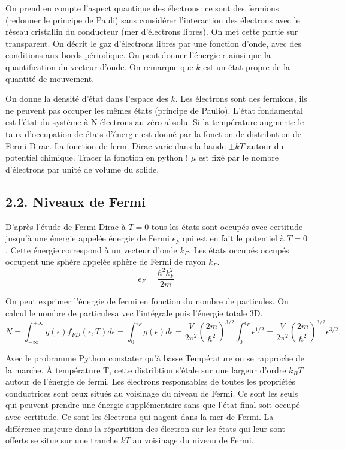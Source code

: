 \documentclass[french, a4paper, 10pt, twocolumn, landscape]{article}
\begin{document}
On prend en compte l'aspect quantique des électrons: ce sont des fermions (redonner le principe de Pauli) sans considérer l'interaction des électrons avec le réseau cristallin du conducteur (mer d'électrons libres). On met cette partie sur transparent. On décrit le gaz d'électrons libres par une fonction d'onde, avec des conditions aux bords périodique. On peut donner l'énergie $\epsilon$ ainsi que la quantification du vecteur d'onde. On remarque que $k$ est un état propre de la quantité de mouvement.\medskip


On donne la densité d'état dans l'espace des $k$. Les électrons sont des fermions, ils ne peuvent pas occuper les mêmes états (principe de Paulio). L'état fondamental est l'état du système à N électrons au zéro absolu. Si la température augmente le taux d'occupation de états d'énergie est donné par la fonction de distribution de Fermi Dirac. La fonction de fermi Dirac varie dans la bande $\pm kT$ autour du potentiel chimique. Tracer la fonction en python ! $\mu$ est fixé par le nombre d'électrons par unité de volume du solide.

\subsection*{2.2. Niveaux de Fermi}

D'après l'étude de Fermi Dirac à $T=0$ tous les états sont occupés avec certitude jusqu'à une énergie appelée énergie de Fermi $\epsilon_F$ qui est en fait le potentiel à $T=0$. Cette énergie correspond à un vecteur d'onde $k_F$. Les états occupés occupés occupent une sphère appelée sphère de Fermi de rayon $k_F$.
\begin{equation}
    \epsilon_F = \dfrac{\hbar^2k_F^2}{2m}    
\end{equation}


On peut exprimer l'énergie de fermi en fonction du nombre de particules. On calcul le nombre de particulesa vec l'intégrale puis l'énergie totale 3D. 
\begin{equation}
    N = \int_{-\infty}^{+\infty}{g(\epsilon)f_{FD}(\epsilon,T)d\epsilon}=\int_{0}^{\epsilon_F}  g(\epsilon)d\epsilon = \dfrac{V}{2\pi^2}\left(\dfrac{2m}{\hbar^2}\right)^{3/2}\int_{0}^{\epsilon_F}\epsilon^{1/2} =\dfrac{V}{2\pi^2}\left(\dfrac{2m}{\hbar^2}\right)^{3/2}\epsilon^{3/2}.
\end{equation}

Avec le probramme Python constater qu'à basse Température on se rapproche de la marche. À température T, cette distribtion s'étale sur une largeur d'ordre $k_BT$ autour de l'énergie de fermi. Les électrons responsables de toutes les propriétés conductrices sont ceux situés au voisinage du niveau de Fermi. Ce sont les seuls qui peuvent prendre une énergie supplémentaire sans que l'état final soit occupé avec certitude. Ce sont les électrons qui nagent dans la mer de Fermi. La différence majeure dans la répartition des électron sur les états qui leur sont offerts se situe sur une tranche $kT$ au voisinage du niveau de Fermi.
\end{document}
